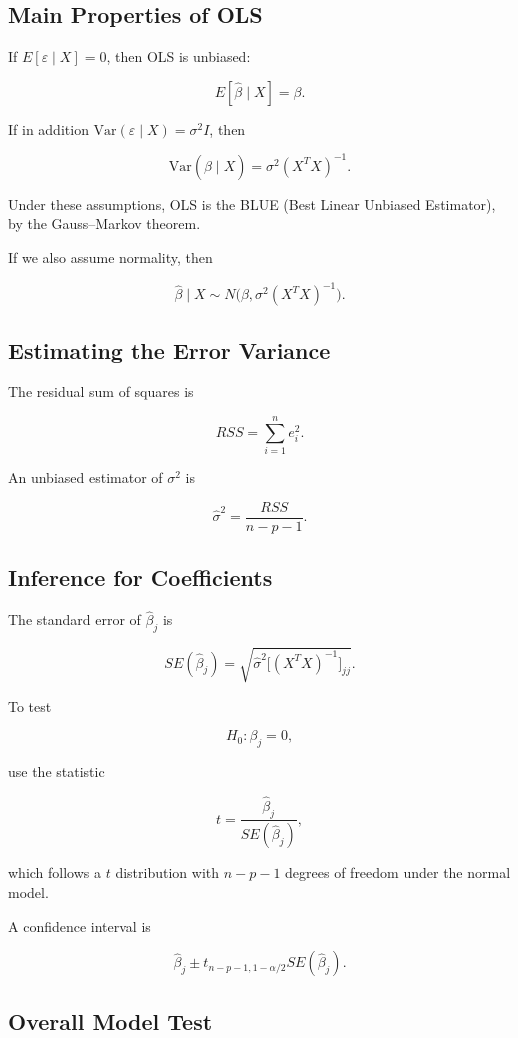 \documentclass[a4paper,10pt]{article}
\begin{document}
\subsection{Main Properties of OLS}

If $E[\varepsilon\mid X]=0$, then OLS is unbiased:

\[
E[\hat\beta \mid X]=\beta.
\]

If in addition $\mathrm{Var}(\varepsilon\mid X)=\sigma^2 I$, then

\[
\mathrm{Var}(\hat\beta \mid X)=\sigma^2 (X^TX)^{-1}.
\]

Under these assumptions, OLS is the BLUE (Best Linear Unbiased Estimator), by the Gauss--Markov theorem.

If we also assume normality, then

\[
\hat\beta \mid X \sim N\bigl(\beta,\sigma^2(X^TX)^{-1}\bigr).
\]

\subsection{Estimating the Error Variance}

The residual sum of squares is

\[
RSS = \sum_{i=1}^n e_i^2.
\]

An unbiased estimator of $\sigma^2$ is

\[
\hat\sigma^2 = \frac{RSS}{n-p-1}.
\]

\subsection{Inference for Coefficients}

The standard error of $\hat\beta_j$ is

\[
SE(\hat\beta_j)
=
\sqrt{\hat\sigma^2\bigl[(X^TX)^{-1}\bigr]_{jj}}.
\]

To test

\[
H_0:\beta_j=0,
\]

use the statistic

\[
t=\frac{\hat\beta_j}{SE(\hat\beta_j)},
\]

which follows a $t$ distribution with $n-p-1$ degrees of freedom under the normal model.

A confidence interval is

\[
\hat\beta_j \pm t_{n-p-1,1-\alpha/2}SE(\hat\beta_j).
\]

\subsection{Overall Model Test}
\end{document}
